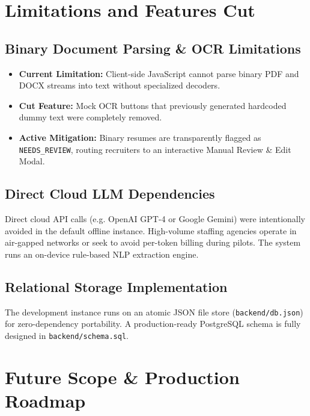 \documentclass[11pt,a4paper,oneside]{report}
\begin{document}
\chapter{Limitations and Features Cut}

\section{Binary Document Parsing \& OCR Limitations}
\begin{itemize}[leftmargin=1.5em]
    \item \textbf{Current Limitation:} Client-side JavaScript cannot parse binary PDF and DOCX streams into text without specialized decoders.
    \item \textbf{Cut Feature:} Mock OCR buttons that previously generated hardcoded dummy text were completely removed.
    \item \textbf{Active Mitigation:} Binary resumes are transparently flagged as \texttt{NEEDS\_REVIEW}, routing recruiters to an interactive Manual Review \& Edit Modal.
\end{itemize}

\section{Direct Cloud LLM Dependencies}
Direct cloud API calls (e.g. OpenAI GPT-4 or Google Gemini) were intentionally avoided in the default offline instance. High-volume staffing agencies operate in air-gapped networks or seek to avoid per-token billing during pilots. The system runs an on-device rule-based NLP extraction engine.

\section{Relational Storage Implementation}
The development instance runs on an atomic JSON file store (\texttt{backend/db.json}) for zero-dependency portability. A production-ready PostgreSQL schema is fully designed in \texttt{backend/schema.sql}.

\chapter{Future Scope \& Production Roadmap}
\end{document}
